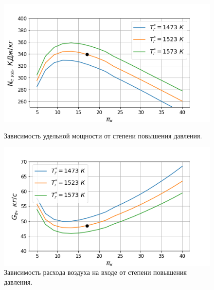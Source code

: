 \documentclass[a4paper,12pt]{article}
\begin{document}
    \begin{figure}[h!]
        \centering
        \includegraphics[scale=0.8]{../plots/cycle_N_e_sp.png}
        \caption{Зависимость удельной мощности от степени повышения давления.}
        \label{cycle_N_e_sp}

        \includegraphics[scale=0.8]{../plots/cycle_G_air.png}
        \caption{Зависимость расхода воздуха на входе от степени повышения давления.}
        \label{cycle_G_air}
    \end{figure}
\end{document}
